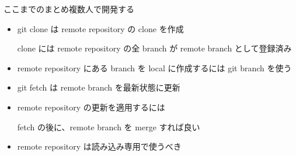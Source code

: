 
\begin{frame}[t]{ここまでのまとめ}{複数人で開発する}

  \begin{itemize}
  \item git clone は remote repository の clone を作成

    clone には remote repository の全 branch が remote branch として登録済み
    \vspace{2ex}

  \item remote repository にある branch を local に作成するには git branch を使う
    \vspace{2ex}

  \item git fetch は remote branch を最新状態に更新
    \vspace{2ex}

  \item remote repository の更新を適用するには

    fetch の後に、remote branch を merge すれば良い
    \vspace{2ex}

  \item remote repository は読み込み専用で使うべき
  \end{itemize}

\end{frame}
